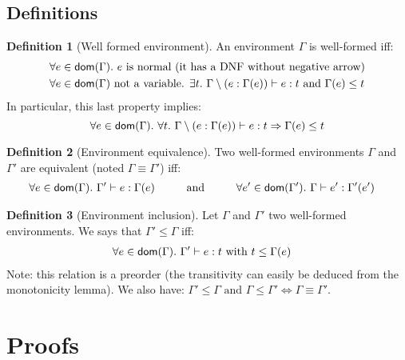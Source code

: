 \documentclass[a4paper]{article}
\theoremstyle{definition}
\newtheorem{definition}{Definition}
\begin{document}
    \subsection{Definitions}
      
    \begin{definition}[Well formed environment]
      An environment $\Gamma$ is well-formed iff:
      \begin{align*}
        &\forall e \in \textsf{dom}(\Gamma).\ e \text{ is normal (it has a DNF without negative arrow)}\\
        &\forall e \in \textsf{dom}(\Gamma) \text{ not a variable. } \exists t.\ \Gamma\setminus(e:\Gamma(e)) \vdash e : t \text{ and } \Gamma(e) \leq t
      \end{align*}
      In particular, this last property implies:
      \[
        \forall e \in \dom \Gamma.\ \forall t.\ \Gamma\setminus(e:\Gamma(e)) \vdash e : t \Rightarrow \Gamma(e) \leq t
      \]
    \end{definition}

    \begin{definition}[Environment equivalence]
      Two well-formed environments $\Gamma$ and $\Gamma'$ are equivalent (noted $\Gamma \equiv \Gamma'$) iff:
      \begin{align*} 
        &\forall e \in \textsf{dom}(\Gamma).\ \Gamma' \vdash e:\Gamma(e) \hspace{1cm} \text{and} \hspace{1cm}
        \forall e' \in \textsf{dom}(\Gamma').\ \Gamma \vdash e':\Gamma'(e')
      \end{align*}
    \end{definition}
  
    \begin{definition}[Environment inclusion]
      Let $\Gamma$ and $\Gamma'$ two well-formed environments. We says that $\Gamma' \leq \Gamma$ iff:
      \begin{align*}
        &\forall e \in \textsf{dom}(\Gamma).\ \Gamma' \vdash e : t \text{ with } t \leq \Gamma(e)
      \end{align*}
      Note: this relation is a preorder (the transitivity can easily be deduced from the monotonicity lemma).
      We also have: $\Gamma' \leq \Gamma \text{ and } \Gamma \leq \Gamma' \Leftrightarrow \Gamma \equiv \Gamma'$.
    \end{definition}

    \section{Proofs}
\end{document}
